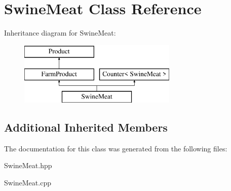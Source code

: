 \hypertarget{class_swine_meat}{}\section{Swine\+Meat Class Reference}
\label{class_swine_meat}
Inheritance diagram for Swine\+Meat\+:\begin{figure}[H]
\begin{center}
\leavevmode
\includegraphics[height=3.000000cm]{class_swine_meat}
\end{center}
\end{figure}
\subsection*{Additional Inherited Members}


The documentation for this class was generated from the following files\+:\begin{DoxyCompactItemize}
\item 
Swine\+Meat.\+hpp\item 
Swine\+Meat.\+cpp\end{DoxyCompactItemize}
